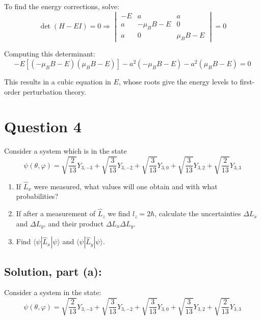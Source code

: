 \documentclass[12pt]{article}
\begin{document}
        To find the energy corrections, solve:
        \[
            \det(H - E I) = 0 \Rightarrow
            \begin{vmatrix}
                -E & a & a \\
                a & -\mu_B B - E & 0 \\
                a & 0 & \mu_B B - E
            \end{vmatrix} = 0
        \]
        
        Computing this determinant:
        \[
            -E \left[ (-\mu_B B - E)(\mu_B B - E) \right]
            - a^2(-\mu_B B - E)
            - a^2(\mu_B B - E)
            = 0
        \]
        
        This results in a cubic equation in \( E \), whose roots give the energy levels to first-order perturbation theory.

\section{Question 4}
    Consider a system which is in the state
    \[
        \psi(\theta, \varphi) = \sqrt{\frac{2}{13}} Y_{3,-3} + \sqrt{\frac{3}{13}} Y_{3,-2} + \sqrt{\frac{3}{13}} Y_{3,0} + \sqrt{\frac{3}{13}} Y_{3,2} + \sqrt{\frac{2}{13}} Y_{3,3}
    \]

    \begin{enumerate}
        \item[(a)] If \( \hat{L}_x \) were measured, what values will one obtain and with what probabilities?
        
        \item[(b)] If after a measurement of \( \hat{L}_z \) we find \( l_z = 2\hbar \), calculate the uncertainties \( \Delta L_x \) and \( \Delta L_y \), and their product \( \Delta L_x \Delta L_y \).
        
        \item[(c)] Find \( \langle \psi | \hat{L}_x | \psi \rangle \) and \( \langle \psi | \hat{L}_y | \psi \rangle \).
    \end{enumerate}

    \subsection{Solution, part (a):}
        Consider a system in the state:
        \[
            \psi(\theta, \varphi) = \sqrt{\frac{2}{13}} Y_{3,-3} + \sqrt{\frac{3}{13}} Y_{3,-2} + \sqrt{\frac{3}{13}} Y_{3,0} + \sqrt{\frac{3}{13}} Y_{3,2} + \sqrt{\frac{2}{13}} Y_{3,3}
        \]
        
\end{document}
